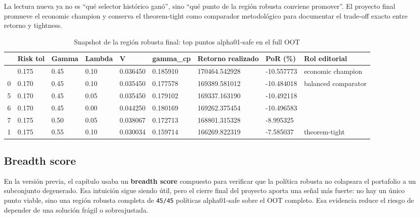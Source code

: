 \documentclass[
  spanish,
  11pt,
  letterpaper,
]{scrbook}
\theoremstyle{plain}
\theoremstyle{remark}
\begin{document}
La lectura nueva ya no es ``qué selector histórico ganó'', sino ``qué
punto de la región robusta conviene promover''. El proyecto final
promueve el economic champion y conserva el theorem-tight como
comparador metodológico para documentar el trade-off exacto entre
retorno y tightness.

{

\begin{longtable}[]{@{}lllllllll@{}}

\caption{\label{tbl-robust-region-snapshot}Snapshot de la región robusta
final: top puntos alpha01-safe en el full OOT}

\tabularnewline

\toprule\noalign{}
& Risk tol & Gamma & Lambda & V & gamma\_cp & Retorno realizado & PoR
(\%) & Rol editorial \\
\midrule\noalign{}
\endhead
\bottomrule\noalign{}
\endlastfoot
2 & 0.175 & 0.45 & 0.10 & 0.036450 & 0.185910 & 170464.542928 &
-10.557773 & economic champion \\
0 & 0.170 & 0.45 & 0.10 & 0.035450 & 0.177578 & 169389.581012 &
-10.484018 & balanced comparator \\
5 & 0.170 & 0.45 & 0.05 & 0.035450 & 0.179102 & 169337.163190 &
-10.492118 & \\
6 & 0.170 & 0.45 & 0.00 & 0.044250 & 0.180169 & 169262.375454 &
-10.496583 & \\
7 & 0.175 & 0.50 & 0.05 & 0.038067 & 0.172713 & 168801.315328 &
-8.995325 & \\
1 & 0.175 & 0.55 & 0.10 & 0.030034 & 0.159714 & 166269.822319 &
-7.585037 & theorem-tight \\

\end{longtable}

}

\subsection{Breadth score}\label{breadth-score}

En la versión previa, el capítulo usaba un \textbf{breadth score}
compuesto para verificar que la política robusta no colapsara el
portafolio a un subconjunto degenerado. Esa intuición sigue siendo útil,
pero el cierre final del proyecto aporta una señal más fuerte: no hay un
único punto viable, sino una región robusta completa de \texttt{45/45}
políticas alpha01-safe sobre el OOT completo. Esa evidencia reduce el
riesgo de depender de una solución frágil o sobreajustada.
\end{document}
